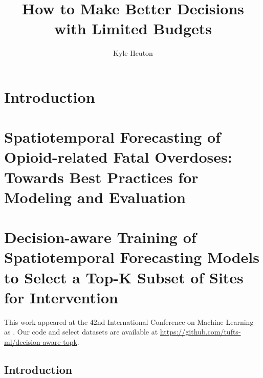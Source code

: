 \documentclass[11pt,final,letterpaper,openany]{mytuftsthesis}
\begin{document}
\title{How to Make Better Decisions with Limited Budgets}
\author{Kyle Heuton}


\beforethesisproper


%

\chapter{Introduction}


\chapter{Spatiotemporal Forecasting of Opioid-related Fatal Overdoses: Towards Best Practices for Modeling and Evaluation}
\label{chap:bpr}
%




%

\chapter{Decision-aware Training of Spatiotemporal Forecasting Models to Select a Top-K Subset of Sites for Intervention}
\label{chap:daml}
\graphicspath{{content/chapters/daml/}}

This work appeared at the 42nd International Conference on Machine Learning as \cite{heuton2025decisionaware}.
Our code and select datasets are available at \url{https://github.com/tufts-ml/decision-aware-topk}.
\section{Introduction}
\label{sec:intro}


\end{document}
